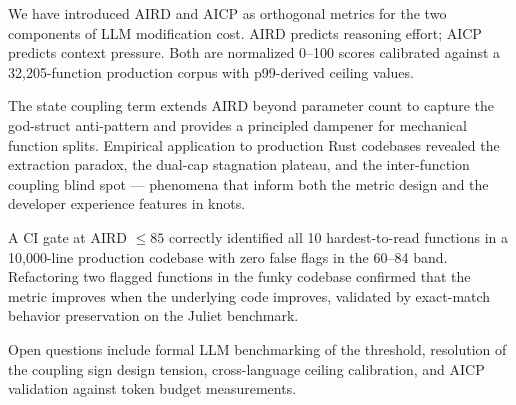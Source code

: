 \documentclass[10pt,twocolumn,letterpaper]{article}
\begin{document}
We have introduced AIRD and AICP as orthogonal metrics for the two
components of LLM modification cost.  AIRD predicts reasoning effort;
AICP predicts context pressure.  Both are normalized 0--100 scores
calibrated against a 32,205-function production corpus with p99-derived
ceiling values.

The state coupling term extends AIRD beyond parameter count to capture
the god-struct anti-pattern and provides a principled dampener for
mechanical function splits.  Empirical application to production Rust
codebases revealed the extraction paradox, the dual-cap stagnation
plateau, and the inter-function coupling blind spot --- phenomena that
inform both the metric design and the developer experience features
in knots.

A CI gate at AIRD $\leq 85$ correctly identified all 10 hardest-to-read
functions in a 10,000-line production codebase with zero false flags in
the 60--84 band.  Refactoring two flagged functions in the funky codebase
confirmed that the metric improves when the underlying code improves,
validated by exact-match behavior preservation on the Juliet benchmark.

Open questions include formal LLM benchmarking of the threshold,
resolution of the coupling sign design tension, cross-language ceiling
calibration, and AICP validation against token budget measurements.


\end{document}
